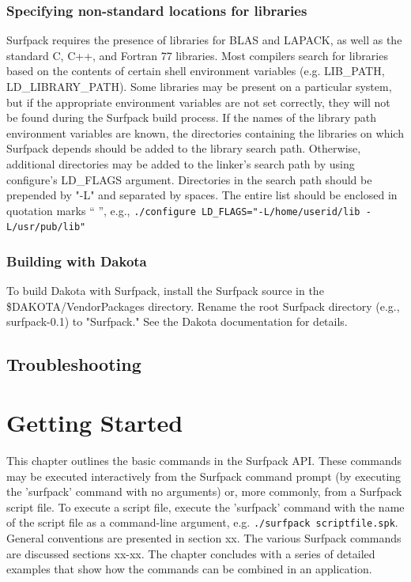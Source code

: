 \documentclass{article}
\begin{document}
\subsubsection{Specifying non-standard locations for libraries}
Surfpack requires the presence of libraries for BLAS and LAPACK, as well as the standard C, C++, and Fortran 77 libraries.  Most compilers search for libraries based on the contents of certain shell environment variables (e.g. LIB\_PATH, LD\_LIBRARY\_PATH).  Some libraries may be present on a particular system, but if the appropriate environment variables are not set correctly, they will not be found during the Surfpack build process.  If the names of the library path environment variables are known, the directories containing the libraries on which Surfpack depends should be added to the library search path.  Otherwise, additional directories may be added to the linker's search path by using configure's LD\_FLAGS argument.  Directories in the search path should be prepended by "-L" and separated by spaces.  The entire list should be enclosed in quotation marks `` '', e.g.,
\texttt{./configure LD\_FLAGS="-L/home/userid/lib -L/usr/pub/lib"}

\subsubsection{Building with Dakota}
To build Dakota with Surfpack, install the Surfpack source in the \$DAKOTA/VendorPackages directory.  Rename the root Surfpack directory (e.g., surfpack-0.1) to "Surfpack."  See the Dakota documentation for details.

\subsection{Troubleshooting}

\section{Getting Started}
This chapter outlines the basic commands in the Surfpack API.  These commands may be executed interactively from the Surfpack command prompt (by executing the 'surfpack' command with no arguments) or, more commonly, from a Surfpack script file.  To execute a script file, execute the 'surfpack' command with the name of the script file as a command-line argument, e.g.
\texttt{./surfpack scriptfile.spk}.  General conventions are presented in section xx.  The various Surfpack commands are discussed sections xx-xx.  The chapter concludes with a series of detailed examples that show how the commands can be combined in an application.
\end{document}

